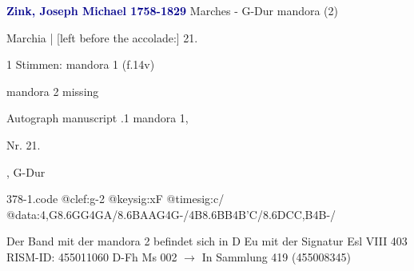 \documentclass[twocolumn]{book}
\begin{document}
\newline \par \vspace{7pt} \textcolor{darkblue}{\textbf{Zink, Joseph Michael  1758-1829}}
\newline Marches - G-Dur
\newline mandora (2)
\newline \begin{itshape}[f.14v, at left:] Marchia | [left before the accolade:] 21.\end{itshape} 
\newline \textcolor{darkblue}{}  1 Stimmen: mandora 1  (f.14v)
\newline \begin{small} mandora 2 missing\end{small} 
\newline Autograph manuscript
.1  mandora 1, \begin{itshape}Nr. 21.\end{itshape}, G-Dur  
\begin{filecontents*}{378-1.code}
@clef:g-2
@keysig:xF
@timesig:c/
@data:4,G{8.6GG}4GA/{8.6BA}{AG}4G-/4B{8.6BB}4B'C/{8.6DC}{C,B}4B-/
\end{filecontents*}
\newline
%
\newline Der Band mit der mandora 2 befindet sich in D Eu mit der Signatur Esl VIII 403
\newline RISM-ID: 455011060
\newline D-Fh  Ms 002
\newline $\rightarrow$ In Sammlung 419 (455008345)
      
\end{document}
